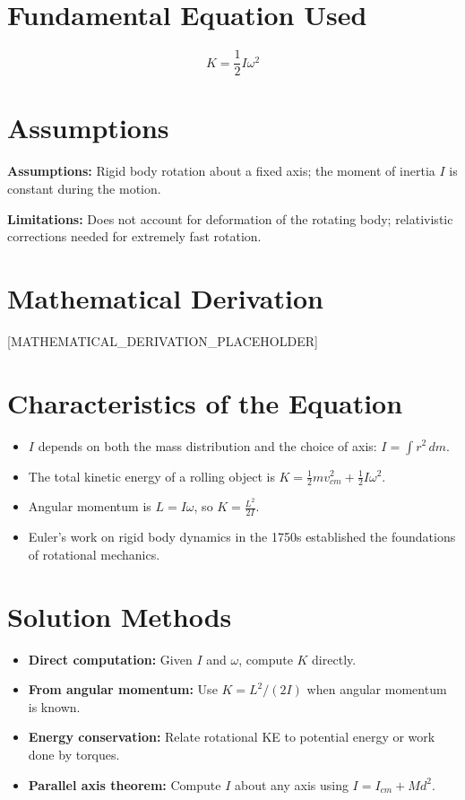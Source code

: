 \documentclass[11pt,openright]{book}
\begin{document}
\section*{Fundamental Equation Used}

\begin{equation}
K = \frac{1}{2}I\omega^2
\end{equation}
\section*{Assumptions}

\textbf{Assumptions:} Rigid body rotation about a fixed axis; the moment of inertia $I$ is constant during the motion.


\textbf{Limitations:} Does not account for deformation of the rotating body; relativistic corrections needed for extremely fast rotation.


\section*{Mathematical Derivation}

[MATHEMATICAL_DERIVATION_PLACEHOLDER]

\section*{Characteristics of the Equation}

\begin{itemize}
    \item $I$ depends on both the mass distribution and the choice of axis: $I = \int r^2\,dm$.
    \item The total kinetic energy of a rolling object is $K = \frac{1}{2}mv_{cm}^2 + \frac{1}{2}I\omega^2$.
    \item Angular momentum is $L = I\omega$, so $K = \frac{L^2}{2I}$.
    \item Euler's work on rigid body dynamics in the 1750s established the foundations of rotational mechanics.
\end{itemize}
\section*{Solution Methods}

\begin{itemize}
    \item \textbf{Direct computation:} Given $I$ and $\omega$, compute $K$ directly.
    \item \textbf{From angular momentum:} Use $K = L^2/(2I)$ when angular momentum is known.
    \item \textbf{Energy conservation:} Relate rotational KE to potential energy or work done by torques.
    \item \textbf{Parallel axis theorem:} Compute $I$ about any axis using $I = I_{cm} + Md^2$.
\end{itemize}
\end{document}

